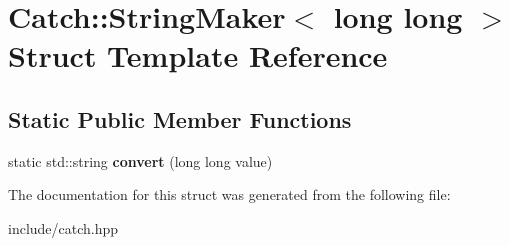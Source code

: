 \hypertarget{structCatch_1_1StringMaker_3_01long_01long_01_4}{}\section{Catch\+:\+:String\+Maker$<$ long long $>$ Struct Template Reference}
\label{structCatch_1_1StringMaker_3_01long_01long_01_4}
\subsection*{Static Public Member Functions}
\begin{DoxyCompactItemize}
\item 
static std\+::string {\bfseries convert} (long long value)\hypertarget{structCatch_1_1StringMaker_3_01long_01long_01_4_a7a58929dca2a14c576d7d6d08bc615d2}{}\label{structCatch_1_1StringMaker_3_01long_01long_01_4_a7a58929dca2a14c576d7d6d08bc615d2}

\end{DoxyCompactItemize}


The documentation for this struct was generated from the following file\+:\begin{DoxyCompactItemize}
\item 
include/catch.\+hpp\end{DoxyCompactItemize}
